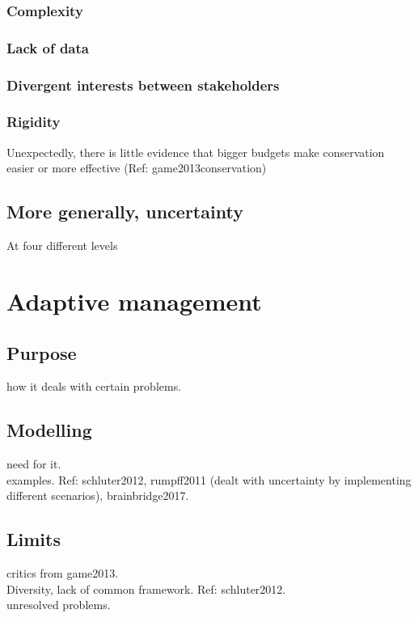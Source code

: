 \documentclass[12pt,a4paper]{article}
\begin{document}
\subsubsection{Complexity}

\subsubsection{Lack of data}

\subsubsection{Divergent interests between stakeholders}

\subsubsection{Rigidity}

Unexpectedly, there is little  evidence that bigger budgets make conservation easier or more effective (Ref: game2013conservation)

\subsection{More generally, uncertainty}
At four different levels

\section{Adaptive management}

\subsection{Purpose}

how it deals with certain problems. 

\subsection{Modelling}

need for it.\\
examples. Ref: schluter2012, rumpff2011 (dealt with uncertainty by implementing different scenarios), brainbridge2017.

\subsection{Limits}

critics from game2013.\\
Diversity, lack of common framework. Ref: schluter2012.\\
unresolved problems.
\end{document}
